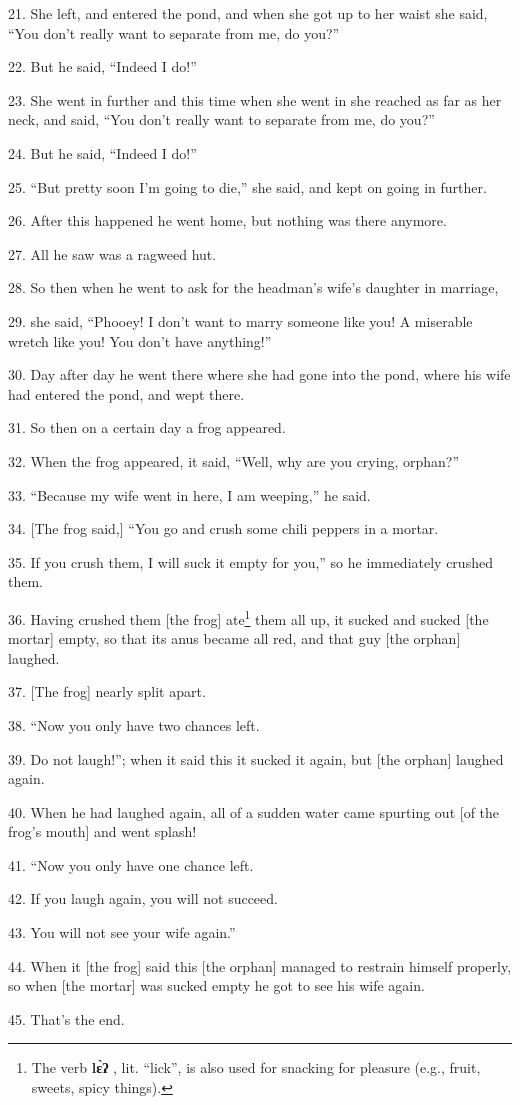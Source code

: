 21. She left, and entered the pond, and when she got up to her waist she said, ``You
don't really want to separate from me, do you?''

22. But he said, ``Indeed I do!''

23. She went in further and this time when she went in she reached as far as her
neck, and said, ``You don't really want to separate from me, do you?''

24. But he said, ``Indeed I do!''

25. ``But pretty soon I'm going to die,'' she said, and kept on going in further.

26. After this happened he went home, but nothing was there anymore.

27. All he saw was a ragweed hut.

28. So then when he went to ask for the headman's wife's daughter in marriage,

29. she said, ``Phooey! I don't want to marry someone like you! A miserable wretch
like you! You don't have anything!''

30. Day after day he went there where she had gone into the pond, where his wife
had entered the pond, and wept there.

31. So then on a certain day a frog appeared.

32. When the frog appeared, it said, ``Well, why are you crying, orphan?''

33. ``Because my wife went in here, I am weeping,'' he said.

34. [The frog said,] ``You go and crush some chili peppers in a mortar.

35. If you crush them, I will suck it empty for you,'' so he immediately crushed
them.

36. Having crushed them [the frog] ate\footnote{The verb \textbf{lɛ̀ʔ} , lit. ``lick'', is also used for snacking for pleasure (e.g., fruit, sweets, spicy things).} them all up, it sucked and sucked [the
mortar] empty, so that its anus became all red, and that guy [the orphan] laughed.

37. [The frog] nearly split apart.

38. ``Now you only have two chances left.

39. Do not laugh!''; when it said this it sucked it again, but [the orphan] laughed
again.

40. When he had laughed again, all of a sudden water came spurting out [of the frog's
mouth] and went splash!

41. ``Now you only have one chance left.

42. If you laugh again, you will not succeed.

43. You will not see your wife again.''

44. When it [the frog] said this [the orphan] managed to restrain himself properly,
so when [the mortar] was sucked empty he got to see his wife again.

45. That's the end.

